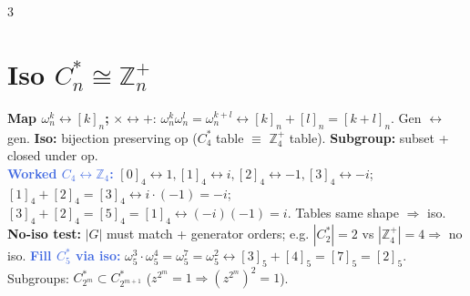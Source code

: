 \documentclass[9pt]{extarticle}
\newcommand{\hl}[1]{\textbf{\textcolor{BrickRed}{#1}}}
\newcommand{\wk}[1]{\textbf{\textcolor{OliveGreen}{#1}}}
\newcommand{\ex}[1]{\textbf{\textcolor{RoyalBlue}{#1}}}
\begin{document}
\begin{multicols}{3}
\section{Iso $C_n^*\cong\mathbb Z_n^+$}
\begin{sloppypar}\raggedright
\hl{Map $\omega_n^k\leftrightarrow[k]_n$;} ${\times}\leftrightarrow{+}$: $\omega_n^k\omega_n^l{=}\omega_n^{k+l}\leftrightarrow[k]_n{+}[l]_n{=}[k{+}l]_n$. Gen $\leftrightarrow$ gen. \hl{Iso:} bijection preserving op ($C_4^*$ table ${\equiv}$ $\mathbb Z_4^+$ table). \hl{Subgroup:} subset + closed under op.\\
\ex{Worked $C_4\leftrightarrow\mathbb Z_4$:} $[0]_4{\leftrightarrow}1,[1]_4{\leftrightarrow}i,[2]_4{\leftrightarrow}{-}1,[3]_4{\leftrightarrow}{-}i$; $[1]_4{+}[2]_4{=}[3]_4\leftrightarrow i{\cdot}({-}1){=}{-}i$; $[3]_4{+}[2]_4{=}[5]_4{=}[1]_4\leftrightarrow({-}i)({-}1){=}i$. Tables same shape $\Rightarrow$ iso.\\
\wk{No-iso test:} $|G|$ must match + generator orders; e.g. $|C_2^*|{=}2$ vs $|\mathbb Z_4^+|{=}4\Rightarrow$ no iso. \ex{Fill $C_5^*$ via iso:} $\omega_5^3{\cdot}\omega_5^4{=}\omega_5^7{=}\omega_5^2\leftrightarrow[3]_5{+}[4]_5{=}[7]_5{=}[2]_5$. Subgroups: $C_{2^m}^*{\subset}C_{2^{m+1}}^*$ ($z^{2^m}{=}1\Rightarrow(z^{2^m})^2{=}1$).
\end{sloppypar}


\end{multicols}
\end{document}
